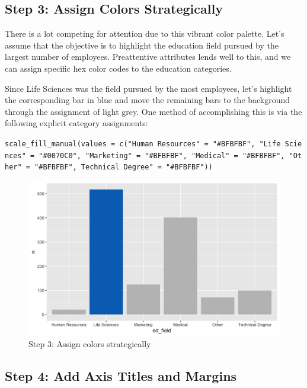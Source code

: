 \documentclass[
]{book}
\begin{document}
\hypertarget{step-3-assign-colors-strategically}{%
\subsection{Step 3: Assign Colors Strategically}\label{step-3-assign-colors-strategically}}

There is a lot competing for attention due to this vibrant color palette. Let's assume that the objective is to highlight the education field pursued by the largest number of employees. Preattentive attributes lends well to this, and we can assign specific hex color codes to the education categories.

Since Life Sciences was the field pursued by the most employees, let's highlight the corresponding bar in blue and move the remaining bars to the background through the assignment of light grey. One method of accomplishing this is via the following explicit category assignments:

\texttt{scale\_fill\_manual(values\ =\ c("Human\ Resources"\ =\ "\#BFBFBF",\ "Life\ Sciences"\ =\ "\#0070C0",\ "Marketing"\ =\ "\#BFBFBF",\ "Medical"\ =\ "\#BFBFBF",\ "Other"\ =\ "\#BFBFBF",\ Technical\ Degree"\ =\ "\#BFBFBF"))}

\begin{figure}

{\centering \includegraphics[width=1\linewidth]{graphics/viz_step_3} 

}

\caption{Step 3: Assign colors strategically}\label{fig:barchart-3}
\end{figure}

\hypertarget{step-4-add-axis-titles-and-margins}{%
\subsection{Step 4: Add Axis Titles and Margins}\label{step-4-add-axis-titles-and-margins}}
\end{document}
